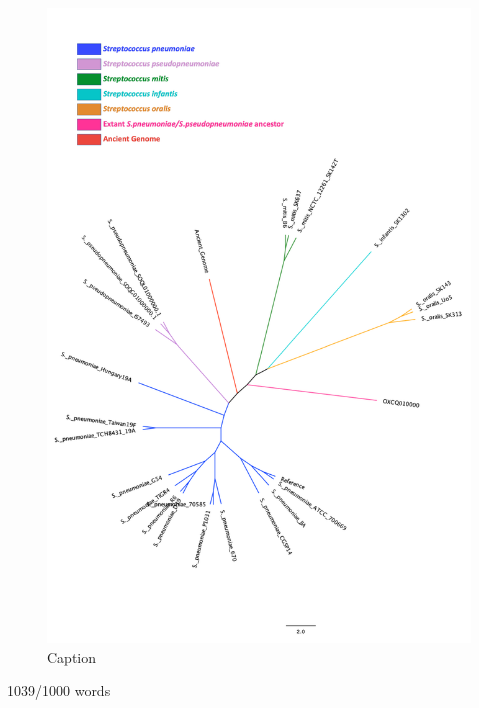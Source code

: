 \documentclass{article}
\begin{document}
\begin{figure}[H]
\centering
    \includegraphics[width=\textwidth]{newMRCA.pdf}
    \caption{Caption}
      \label{fig:extantancient}
\end{figure}
1039/1000 words
\end{document}
